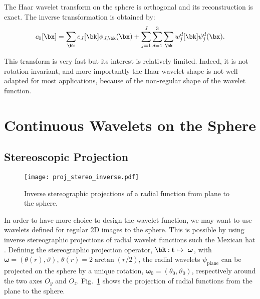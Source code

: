
The Haar wavelet transform on the sphere is orthogonal and its reconstruction is exact. The inverse transformation is obtained by:
 \begin{eqnarray}
\label{def_recons_haar}
c_0[\bx] = \sum_{\bk}  c_{J}[\bk]  \phi_{J,\bk}(\bx) + \sum_{j=1}^{J} \sum_{d=1}^3 \sum_{\bk} w^{d}_{j}[\bk]  \psi^d_{j}(\bx) .
\end{eqnarray}

This transform is very fast but its interest is relatively limited. Indeed, it is not rotation invariant, and more importantly the Haar wavelet shape is not well adapted for most applications, because of the non-regular shape of the wavelet function.



\section{Continuous Wavelets on the Sphere}

\subsection{Stereoscopic Projection}
\label{chap_mex_hat}


\begin{figure}[htb]
\centering
\texttt{[image: proj\_stereo\_inverse.pdf]}
\caption{Inverse stereographic projections  of a  radial  function  from plane  to the  sphere.}
\label{figprojstereo_direct}
\end{figure}

In order to have more choice to design the wavelet function, we may want to use wavelets defined for regular 2D images to the sphere.
This is possible by using inverse stereographic projections of radial wavelet functions such the Mexican hat \citep{wave:cayon01}.
Defining the stereographic projection operator, $\bR: {\bf t}  \mapsto \ {\boldsymbol \omega} $, with $  {\boldsymbol \omega}  = (\theta(r),\vartheta) $, $\theta(r) = 2 \arctan(r/2)$,
the  radial wavelets $\psi_{\mathrm{plane}}$ can be projected on the sphere by a unique rotation,   ${\boldsymbol \omega}_0 =(\theta_0,\vartheta_0)$, respectively around the two axes   $O_y$ and $O_z$.  
Fig.~\ref{figprojstereo_direct} shows the projection of radial functions from the plane to the sphere. 
 
